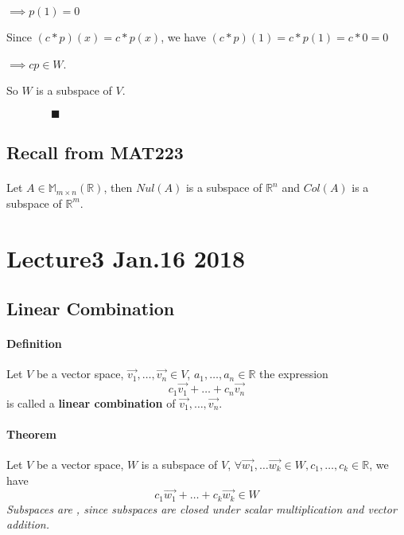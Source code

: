 \documentclass[11pt]{article}
\begin{document}
	$\implies p(1) = 0$ 
	
	Since $(c*p)(x) = c*p(x)$, we have $(c*p)(1) = c*p(1) = c*0 = 0$ 
	
	$\implies cp \in W$.
	
	So $W$ is a subspace of $V$.
	
	$\qquad \qquad \blacksquare$
	
	\subsection{Recall from MAT223}
	\paragraph{} Let $A \in \mathbb{M}_{m \times n}(\mathbb{R})$, then $Nul(A)$ is a subspace of $\mathbb{R}^n$ and $Col(A)$ is a subspace of $\mathbb{R}^m$.
	
	\section{Lecture3 Jan.16 2018}
	\subsection{Linear Combination}
	\paragraph{Definition} Let $V$ be a vector space, $\vec{v_1},\dots,\vec{v_n} \in V$, $a_1,\dots,a_n \in \mathbb{R}$ the expression
	\[
	c_1 \vec{v_1} + \dots + c_n \vec{v_n}
	\]
	is called a \textbf{linear combination} of $\vec{v_1},\dots,\vec{v_n}$.
	
	\paragraph{Theorem} Let $V$ be a vector space, $W$ is a subspace of $V$, $\forall \vec{w_1},\dots\vec{w_k}\in W, c_1,\dots,c_k \in \mathbb{R}$, we have 
	\[
	c_1 \vec{w_1} + \dots + c_k \vec{w_k} \in W
	\]
	\emph{Subspaces are , since subspaces are closed under scalar multiplication and vector addition.}
	
\end{document}
